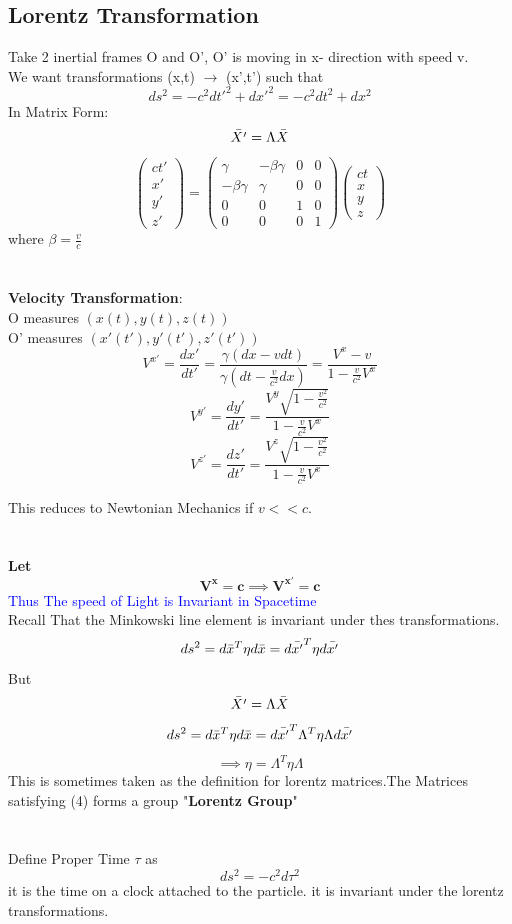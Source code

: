 \documentclass{article}
\newcommand\note[1]{\textcolor{blue}{#1}}
\begin{document}
\subsection{Lorentz Transformation}
Take 2 inertial frames O and O', O' is moving in x- direction  with speed v.\\
We want transformations (x,t) $\xrightarrow{}$ (x',t') such that $$ds^2=-c^2dt'^2+dx'^2=-c^2dt^2+dx^2$$
In Matrix Form:
$$\Bar{X'}=\Lambda \Bar{X}$$
$$\begin{pmatrix}
    ct'\\x'\\y'\\z'
\end{pmatrix}=\begin{pmatrix}
    \gamma &-\beta \gamma&0&0\\-\beta \gamma &\gamma &0&0\\0&0&1&0\\0&0&0&1
\end{pmatrix}\begin{pmatrix}
    ct\\x\\y\\z
\end{pmatrix}$$ where $\beta = \frac{v}{c}$
\\ \\ \\
\textbf{Velocity Transformation}:\\
O measures $(x(t),y(t),z(t))$\\
O' measures $(x'(t'),y'(t'),z'(t'))$
$$V^{x'} = \frac{dx'}{dt'}=\frac{\gamma(dx-vdt)}{\gamma(dt-\frac{v}{c^2}dx)}= \frac{V^{x}-v}{1-\frac{v}{c^2}V^{x}}$$
$$V^{y'} = \frac{dy'}{dt'}=\frac{V^{y}\sqrt{1-\frac{v^2}{c^2}}}{1-\frac{v}{c^2}V^{x}}$$
$$V^{z'} = \frac{dz'}{dt'}=\frac{V^{z}\sqrt{1-\frac{v^2}{c^2}}}{1-\frac{v}{c^2}V^{x}}$$

This reduces to Newtonian Mechanics if $v<<c$.
\\ \\ \\
\textbf{Let} $$\mathbf{V^x=c \implies V^{x'}= c}$$
\note{    Thus The speed of Light is Invariant in Spacetime
}
\\
Recall That the Minkowski line element is invariant under thes transformations.
$$ds^2= d\Bar{x}^T \eta d\Bar{x}= d\Bar{x'}^T \eta d\Bar{x'} $$
But $$\Bar{X'}=\Lambda \Bar{X}$$
$$ds^2= d\Bar{x}^T \eta d\Bar{x}= d\Bar{x'}^T \Lambda^T \eta \Lambda d\Bar{x'}$$
\begin{equation}
\implies \eta =\Lambda^T \eta \Lambda   
\end{equation}
This is sometimes taken as the definition for lorentz matrices.The Matrices satisfying (4) forms a group "\textbf{Lorentz Group}"
\\ \\
\\
Define Proper Time $\tau$ as
$$ds^2=-c^2d\tau^2$$ it is the time on a clock attached to the particle. it is invariant under the lorentz transformations.
\end{document}
